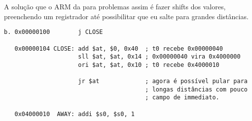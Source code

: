 \documentclass{article}
\begin{document}
A solução que o ARM da para problemas assim é fazer shifts dos valores, 
preenchendo um registrador até possibilitar que eu salte para grandes 
distâncias.

\begin{verbatim}
b. 0x00000100        j CLOSE

   0x00000104 CLOSE: add $at, $0, 0x40  ; t0 recebe 0x00000040
                     sll $at, $at, 0x14 ; 0x00000040 vira 0x4000000
                     ori $at, $at, 0x10 ; t0 recebe 0x4000010

                     jr $at             ; agora é possível pular para
                                        ; longas distâncias com pouco
                                        ; campo de immediato.

   0x04000010  AWAY: addi $s0, $s0, 1
\end{verbatim}
\end{document}
